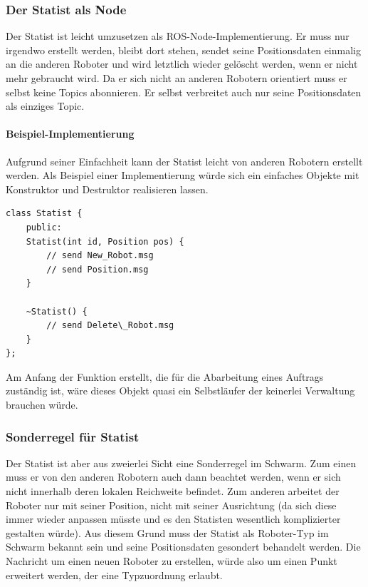 \subsubsection*{Der Statist als Node}

Der Statist ist leicht umzusetzen als \ac{ROS}-Node-Implementierung. Er muss nur irgendwo erstellt werden, bleibt dort stehen, sendet seine Positionsdaten einmalig an die anderen Roboter und wird letztlich wieder gelöscht werden, wenn er nicht mehr gebraucht wird. Da er sich nicht an anderen Robotern orientiert muss er selbst keine Topics abonnieren. Er selbst verbreitet auch nur seine Positionsdaten als einziges Topic. 

\paragraph*{Beispiel-Implementierung}
Aufgrund seiner Einfachheit kann der Statist leicht von anderen Robotern erstellt werden. Als Beispiel einer Implementierung würde sich ein einfaches Objekte mit Konstruktor und Destruktor realisieren lassen.

\begin{lstlisting}[style=cpp]
class Statist {
	public:
	Statist(int id, Position pos) {
		// send New_Robot.msg
		// send Position.msg
	}
	
	~Statist() {
		// send Delete\_Robot.msg
	}
};
\end{lstlisting}

Am Anfang der Funktion erstellt, die für die Abarbeitung eines Auftrags zuständig ist, wäre dieses Objekt quasi ein Selbstläufer der keinerlei Verwaltung brauchen würde.

\subsubsection*{Sonderregel für Statist}

Der Statist ist aber aus zweierlei Sicht eine Sonderregel im Schwarm. Zum einen muss er von den anderen Robotern auch dann beachtet werden, wenn er sich nicht innerhalb deren lokalen Reichweite befindet. Zum anderen arbeitet der Roboter nur mit seiner Position, nicht mit seiner Ausrichtung (da sich diese immer wieder anpassen müsste und es den Statisten wesentlich komplizierter gestalten würde). Aus diesem Grund muss der Statist als Roboter-Typ im Schwarm bekannt sein und seine Positionsdaten gesondert behandelt werden. Die Nachricht um einen neuen Roboter zu erstellen, würde also um einen Punkt erweitert werden, der eine Typzuordnung erlaubt.

